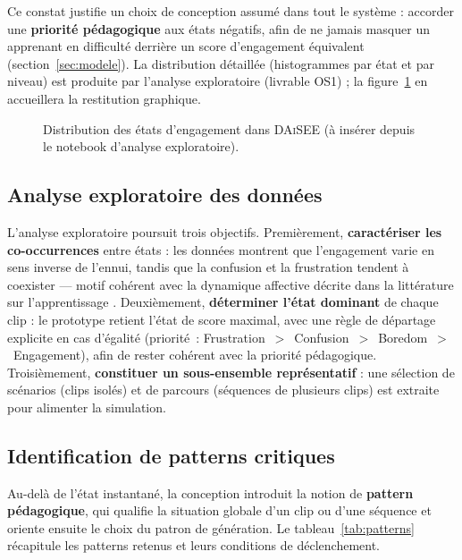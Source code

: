 Ce constat justifie un choix de conception assumé dans tout le système : accorder
une \textbf{priorité pédagogique} aux états négatifs, afin de ne jamais masquer un
apprenant en difficulté derrière un score d'engagement équivalent
(section~\ref{sec:modele}). La distribution détaillée (histogrammes par état et
par niveau) est produite par l'analyse exploratoire (livrable OS1) ; la
figure~\ref{fig:distribution} en accueillera la restitution graphique.

\begin{figure}[H]
\centering
\caption{Distribution des états d'engagement dans \textsc{DAiSEE}
(à insérer depuis le notebook d'analyse exploratoire).}
\label{fig:distribution}
\end{figure}

\subsection{Analyse exploratoire des données}

L'analyse exploratoire poursuit trois objectifs. Premièrement, \textbf{caractériser
les co-occurrences} entre états : les données montrent que l'engagement varie en
sens inverse de l'ennui, tandis que la confusion et la frustration tendent à
coexister — motif cohérent avec la dynamique affective décrite dans la littérature
sur l'apprentissage \cite{dmello2012dynamics,pekrun2006control}. Deuxièmement,
\textbf{déterminer l'état dominant} de chaque clip : le prototype retient l'état
de score maximal, avec une règle de départage explicite en cas d'égalité
(priorité~: Frustration~$>$~Confusion~$>$~Boredom~$>$~Engagement), afin de rester
cohérent avec la priorité pédagogique. Troisièmement, \textbf{constituer un
sous-ensemble représentatif} : une sélection de scénarios (clips isolés) et de
parcours (séquences de plusieurs clips) est extraite pour alimenter la simulation.

\subsection{Identification de patterns critiques}

Au-delà de l'état instantané, la conception introduit la notion de \textbf{pattern
pédagogique}, qui qualifie la situation globale d'un clip ou d'une séquence et
oriente ensuite le choix du patron de génération. Le tableau~\ref{tab:patterns}
récapitule les patterns retenus et leurs conditions de déclenchement.


